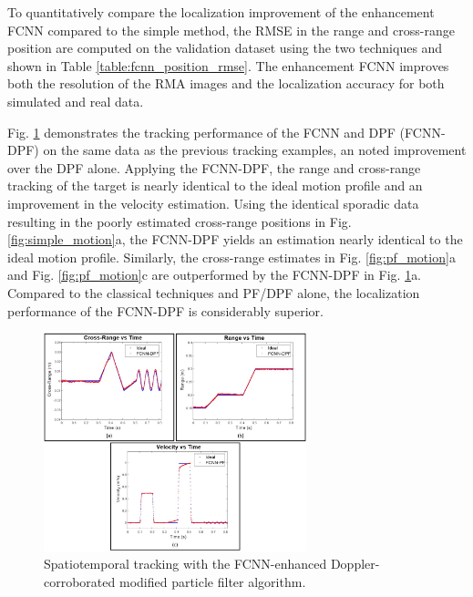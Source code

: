 \documentclass[10pt,journal,final]{IEEEtran}
\begin{document}
To quantitatively compare the localization improvement of the enhancement FCNN compared to the simple method, the RMSE in the range and cross-range position are computed on the validation dataset using the two techniques and shown in Table \ref{table:fcnn_position_rmse}. 
The enhancement FCNN improves both the resolution of the RMA images and the localization accuracy for both simulated and real data. 

Fig. \ref{fig:fcnn_dpf_motion} demonstrates the tracking performance of the FCNN and DPF (FCNN-DPF) on the same data as the previous tracking examples, an noted improvement over the DPF alone. 
Applying the FCNN-DPF, the range and cross-range tracking of the target is nearly identical to the ideal motion profile and an improvement in the velocity estimation.
Using the identical sporadic data resulting in the poorly estimated cross-range positions in Fig. \ref{fig:simple_motion}a, the FCNN-DPF yields an estimation nearly identical to the ideal motion profile.
Similarly, the cross-range estimates in Fig. \ref{fig:pf_motion}a and Fig. \ref{fig:pf_motion}c are outperformed by the FCNN-DPF in Fig. \ref{fig:fcnn_dpf_motion}a.
Compared to the classical techniques and PF/DPF alone, the localization performance of the FCNN-DPF is considerably superior.

\begin{figure}[h]
	\centering
	\includegraphics[width=3in]{fcnn_dpf_motion.jpg}
	\caption{Spatiotemporal tracking with the FCNN-enhanced Doppler-corroborated modified particle filter algorithm.}
	\label{fig:fcnn_dpf_motion}
\end{figure}
\end{document}
